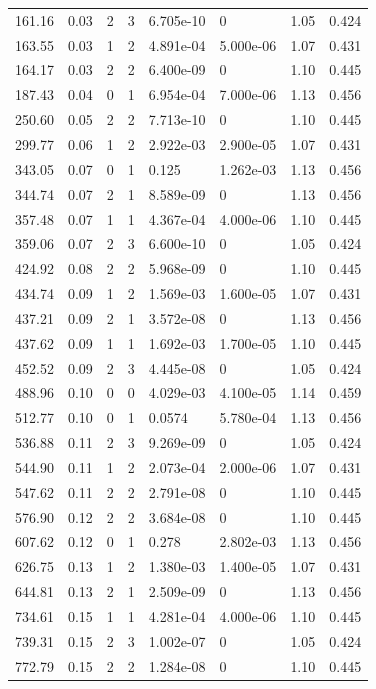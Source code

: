 \documentclass[preview]{standalone}
\begin{document}
{{\begin{tabular}{L{1.2cm}C{1.2cm} C{0.3cm}C{0.5cm} C{1.4cm}C{1.4cm} C{1.4cm}C{1.4cm}}
  161.16  &  0.03  & 2     &  3 &  6.705e-10  & 0  & 1.05 &  0.424   \\ 
  163.55  &  0.03  & 1     &  2 &  4.891e-04  & 5.000e-06  & 1.07 &  0.431   \\ 
  164.17  &  0.03  & 2     &  2 &  6.400e-09  & 0  & 1.10 &  0.445   \\ 
  187.43  &  0.04  & 0     &  1 &  6.954e-04  & 7.000e-06  & 1.13 &  0.456   \\ 
  250.60  &  0.05  & 2     &  2 &  7.713e-10  & 0  & 1.10 &  0.445   \\ 
  299.77  &  0.06  & 1     &  2 &  2.922e-03  & 2.900e-05  & 1.07 &  0.431   \\ 
  343.05  &  0.07  & 0     &  1 &  0.125  & 1.262e-03  & 1.13 &  0.456   \\ 
  344.74  &  0.07  & 2     &  1 &  8.589e-09  & 0  & 1.13 &  0.456   \\ 
  357.48  &  0.07  & 1     &  1 &  4.367e-04  & 4.000e-06  & 1.10 &  0.445   \\ 
  359.06  &  0.07  & 2     &  3 &  6.600e-10  & 0  & 1.05 &  0.424   \\ 
  424.92  &  0.08  & 2     &  2 &  5.968e-09  & 0  & 1.10 &  0.445   \\ 
  434.74  &  0.09  & 1     &  2 &  1.569e-03  & 1.600e-05  & 1.07 &  0.431   \\ 
  437.21  &  0.09  & 2     &  1 &  3.572e-08  & 0  & 1.13 &  0.456   \\ 
  437.62  &  0.09  & 1     &  1 &  1.692e-03  & 1.700e-05  & 1.10 &  0.445   \\ 
  452.52  &  0.09  & 2     &  3 &  4.445e-08  & 0  & 1.05 &  0.424   \\ 
  488.96  &  0.10  & 0     &  0 &  4.029e-03  & 4.100e-05  & 1.14 &  0.459   \\ 
  512.77  &  0.10  & 0     &  1 &  0.0574  & 5.780e-04  & 1.13 &  0.456   \\ 
  536.88  &  0.11  & 2     &  3 &  9.269e-09  & 0  & 1.05 &  0.424   \\ 
  544.90  &  0.11  & 1     &  2 &  2.073e-04  & 2.000e-06  & 1.07 &  0.431   \\ 
  547.62  &  0.11  & 2     &  2 &  2.791e-08  & 0  & 1.10 &  0.445   \\ 
  576.90  &  0.12  & 2     &  2 &  3.684e-08  & 0  & 1.10 &  0.445   \\ 
  607.62  &  0.12  & 0     &  1 &  0.278  & 2.802e-03  & 1.13 &  0.456   \\ 
  626.75  &  0.13  & 1     &  2 &  1.380e-03  & 1.400e-05  & 1.07 &  0.431   \\ 
  644.81  &  0.13  & 2     &  1 &  2.509e-09  & 0  & 1.13 &  0.456   \\ 
  734.61  &  0.15  & 1     &  1 &  4.281e-04  & 4.000e-06  & 1.10 &  0.445   \\ 
  739.31  &  0.15  & 2     &  3 &  1.002e-07  & 0  & 1.05 &  0.424   \\ 
  772.79  &  0.15  & 2     &  2 &  1.284e-08  & 0  & 1.10 &  0.445   \\ 
\hline 
\end{tabular} 

}}
\end{document}
